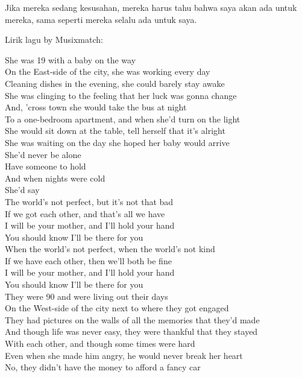 \documentclass[
  letterpaper,
  DIV=11,
  numbers=noendperiod]{scrreprt}
\begin{document}
Jika mereka sedang kesusahan, mereka harus tahu bahwa saya akan ada
untuk mereka, sama seperti mereka selalu ada untuk saya.

Lirik lagu by Musixmatch:

She was 19 with a baby on the way\\
On the East-side of the city, she was working every day\\
Cleaning dishes in the evening, she could barely stay awake\\
She was clinging to the feeling that her luck was gonna change\\
And, 'cross town she would take the bus at night\\
To a one-bedroom apartment, and when she'd turn on the light\\
She would sit down at the table, tell herself that it's alright\\
She was waiting on the day she hoped her baby would arrive\\
She'd never be alone\\
Have someone to hold\\
And when nights were cold\\
She'd say\\
The world's not perfect, but it's not that bad\\
If we got each other, and that's all we have\\
I will be your mother, and I'll hold your hand\\
You should know I'll be there for you\\
When the world's not perfect, when the world's not kind\\
If we have each other, then we'll both be fine\\
I will be your mother, and I'll hold your hand\\
You should know I'll be there for you\\
They were 90 and were living out their days\\
On the West-side of the city next to where they got engaged\\
They had pictures on the walls of all the memories that they'd made\\
And though life was never easy, they were thankful that they stayed\\
With each other, and though some times were hard\\
Even when she made him angry, he would never break her heart\\
No, they didn't have the money to afford a fancy car\\
\end{document}
